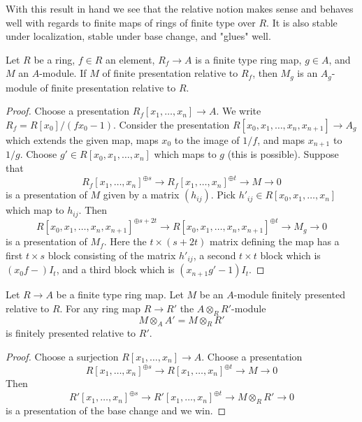 \noindent
With this result in hand we see that the relative notion makes sense
and behaves well with regards to finite maps of rings of finite type
over $R$. It is also stable under localization, stable under
base change, and "glues" well.

\begin{lemma}
\label{lemma-localize-relative-finite-presentation}
Let $R$ be a ring, $f \in R$ an element, $R_f \to A$ is a finite type ring map,
$g \in A$, and $M$ an $A$-module. If $M$ of finite presentation relative
to $R_f$, then $M_g$ is an $A_g$-module of finite presentation relative
to $R$.
\end{lemma}

\begin{proof}
Choose a presentation $R_f[x_1, \ldots, x_n] \to A$. We write
$R_f = R[x_0]/(fx_0 - 1)$. Consider the presentation
$R[x_0, x_1, \ldots, x_n, x_{n + 1}] \to A_g$ which extends the given
map, maps $x_0$ to the image of $1/f$, and maps $x_{n + 1}$ to $1/g$.
Choose $g' \in R[x_0, x_1, \ldots, x_n]$ which maps to $g$ (this is
possible). Suppose that
$$
R_f[x_1, \ldots, x_n]^{\oplus s} \to
R_f[x_1, \ldots, x_n]^{\oplus t} \to M \to 0
$$
is a presentation of $M$ given by a matrix $(h_{ij})$. Pick
$h'_{ij} \in R[x_0, x_1, \ldots, x_n]$ which map to $h_{ij}$.
Then
$$
R[x_0, x_1, \ldots, x_n, x_{n + 1}]^{\oplus s + 2t} \to
R[x_0, x_1, \ldots, x_n, x_{n + 1}]^{\oplus t} \to M_g \to 0
$$
is a presentation of $M_f$.
Here the $t \times (s + 2t)$ matrix defining the map has a first
$t \times s$ block consisting of the matrix $h'_{ij}$, a second
$t \times t$ block which is $(x_0f - )I_t$, and a third block
which is $(x_{n + 1}g' - 1)I_t$.
\end{proof}

\begin{lemma}
\label{lemma-base-change-relative-finite-presentation}
Let $R \to A$ be a finite type ring map. Let $M$ be an $A$-module finitely
presented relative to $R$. For any ring map $R \to R'$ the
$A \otimes_R R'$-module
$$
M \otimes_A A' = M \otimes_R R'
$$
is finitely presented relative to $R'$.
\end{lemma}

\begin{proof}
Choose a surjection $R[x_1, \ldots, x_n] \to A$. Choose a presentation
$$
R[x_1, \ldots, x_n]^{\oplus s} \to
R[x_1, \ldots, x_n]^{\oplus t} \to M \to 0
$$
Then
$$
R'[x_1, \ldots, x_n]^{\oplus s} \to
R'[x_1, \ldots, x_n]^{\oplus t} \to M \otimes_R R' \to 0
$$
is a presentation of the base change and we win.
\end{proof}

